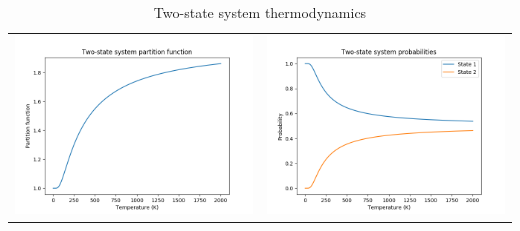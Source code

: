 \documentclass[11pt]{article}
\begin{document}
\begin{table}
   \caption{Two-state system thermodynamics}
\begin{tabular}{cc}
\includegraphics[scale=0.5]{Images/2state-partition.png} & \includegraphics[scale=0.5]{Images/2state-probability.png} \\

\end{tabular}
\end{table}
\end{document}

